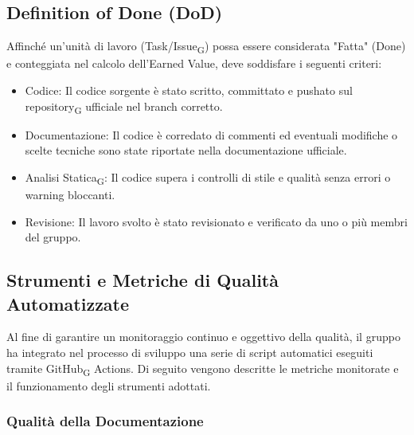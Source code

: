 \documentclass[11pt,a4paper]{article}
\newcommand{\gls}[1]{#1\textsubscript{G}}
\begin{document}
\subsection{Definition of Done (DoD)}
Affinché un'unità di lavoro (Task/\gls{Issue}) possa essere considerata "Fatta" (Done) e conteggiata nel calcolo dell'Earned Value, deve soddisfare i seguenti criteri:
\begin{itemize} 
    \item Codice: Il codice sorgente è stato scritto, committato e pushato sul \gls{repository} ufficiale nel branch corretto.
    \item Documentazione: Il codice è corredato di commenti ed eventuali modifiche o scelte tecniche sono state riportate nella documentazione ufficiale.
    \item \gls{Analisi Statica}: Il codice supera i controlli di stile e qualità senza errori o warning bloccanti. 
    \item Revisione: Il lavoro svolto è stato revisionato e verificato da uno o più membri del gruppo.
\end{itemize}

\subsection{Strumenti e Metriche di Qualità Automatizzate}
Al fine di garantire un monitoraggio continuo e oggettivo della qualità, il gruppo ha integrato nel processo di sviluppo una serie di script automatici eseguiti tramite \gls{GitHub} Actions. Di seguito vengono descritte le metriche monitorate e il funzionamento degli strumenti adottati.

\subsubsection{Qualità della Documentazione}
\end{document}
